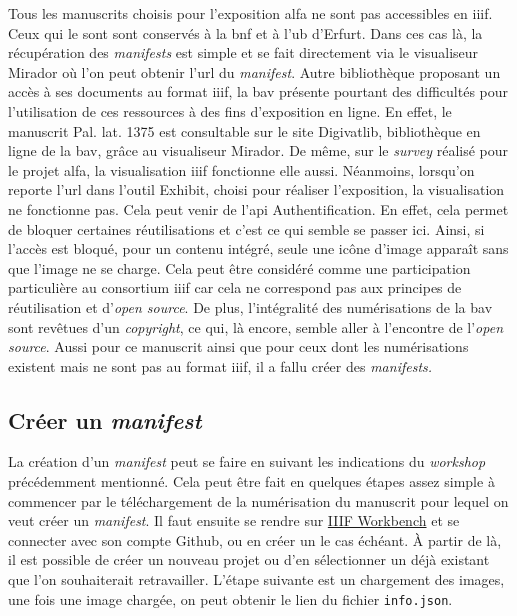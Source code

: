 	Tous les manuscrits choisis pour l'exposition \acrshort{alfa} ne sont pas accessibles en \acrshort{iiif}. Ceux qui le sont sont conservés à la \acrlong{bnf} et à l'\acrlong{ub} d'Erfurt. Dans ces cas là, la récupération des \textit{manifests} est simple et se fait directement via le visualiseur Mirador où l'on peut obtenir l'\acrshort{url} du \textit{manifest}. Autre bibliothèque proposant un accès à ses documents au format \acrshort{iiif}, la \acrlong{bav} présente pourtant des difficultés pour l'utilisation de ces ressources à des fins d'exposition en ligne. En effet, le manuscrit Pal. lat. 1375 est consultable sur le site Digivatlib, bibliothèque en ligne de la \acrlong{bav}, grâce au visualiseur Mirador. De même, sur le \textit{survey} réalisé pour le projet \acrshort{alfa}, la visualisation \acrshort{iiif} fonctionne elle aussi. Néanmoins, lorsqu'on reporte l'\acrshort{url} dans l'outil Exhibit, choisi pour réaliser l'exposition, la visualisation ne fonctionne pas. Cela peut venir de l'\acrshort{api} Authentification. En effet, cela permet de bloquer certaines réutilisations et c'est ce qui semble se passer ici. Ainsi, si l'accès est bloqué, pour un contenu intégré, seule une icône d'image apparaît sans que l'image ne se charge. Cela peut être considéré comme une participation particulière au consortium \acrshort{iiif} car cela ne correspond pas aux principes de réutilisation et d'\textit{open source}. De plus, l'intégralité des numérisations de la \acrlong{bav} sont revêtues d'un \textit{copyright}, ce qui, là encore, semble aller à l'encontre de l'\textit{open source}. Aussi pour ce manuscrit ainsi que pour ceux dont les numérisations existent mais ne sont pas au format \acrshort{iiif}, il a fallu créer des \textit{manifests.}
	
	\subsection{Créer un \textit{manifest}}
	La création d'un \textit{manifest} peut se faire en suivant les indications du \textit{workshop} précédemment mentionné. Cela peut être fait en quelques étapes assez simple à commencer par le téléchargement de la numérisation du manuscrit pour lequel on veut créer un \textit{manifest}. Il faut ensuite se rendre sur \href{https://workbench.gdmrdigital.com/}{IIIF Workbench} et se connecter avec son compte Github, ou en créer un le cas échéant. À partir de là, il est possible de créer un nouveau projet ou d'en sélectionner un déjà existant que l'on souhaiterait retravailler. L'étape suivante est un chargement des images, une fois une image chargée, on peut obtenir le lien du fichier \texttt{info.json}.  
	
